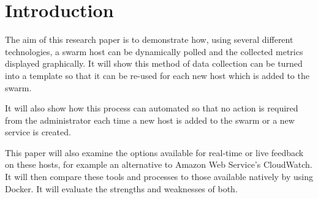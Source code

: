 \section{Introduction}
The aim of this research paper is to demonstrate how, using several different technologies, a swarm host can be dynamically polled and the collected metrics displayed graphically. It will show this method of data collection can be turned into a template so that it can be re-used for each new host which is added to the swarm.

It will also show how this process can automated so that no action is required from the administrator each time a new host is added to the swarm or a new service is created.

This paper will also examine the options available for real-time or live feedback on these hosts, for example an alternative to Amazon Web Service's CloudWatch. It will then compare these tools and processes to those available natively by using Docker. It will evaluate the strengths and weaknesses of both.
